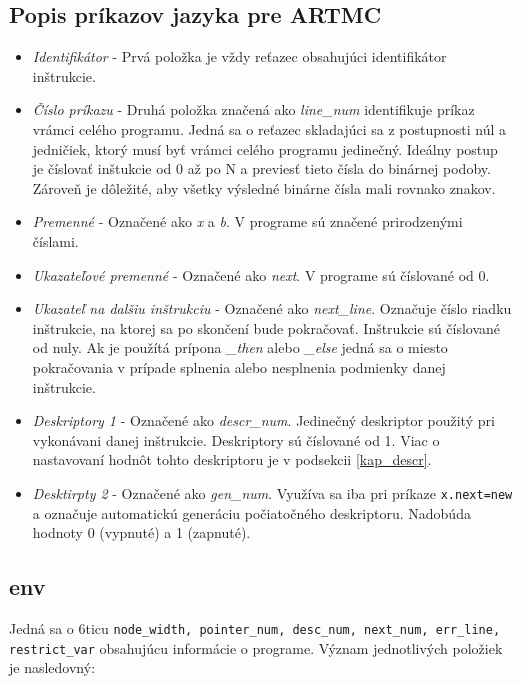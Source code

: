\subsection{Popis príkazov jazyka pre ARTMC}
\begin{itemize}
    \item \textit{Identifikátor} - Prvá položka je vždy reťazec obsahujúci identifikátor inštrukcie.
    \item \textit{Číslo príkazu} - Druhá položka značená ako \textit{line\_num} identifikuje príkaz
        vrámci celého programu. Jedná sa o reťazec skladajúci sa z postupnosti
        núl a jedničiek, ktorý musí byť vrámci celého  programu jedinečný.
        Ideálny postup je číslovať inštukcie od 0 až po N a previesť tieto
        čísla do binárnej podoby. Zároveň je dôležité, aby všetky výsledné binárne čísla mali rovnako znakov.
    \item \textit{Premenné} - Označené ako \textit{x} a \textit{b}. V programe sú značené prirodzenými číslami.
    \item \textit{Ukazateľové premenné} - Označené ako \textit{next}. V programe sú číslované od 0.
    \item \textit{Ukazateľ na dalšiu inštrukciu} - Označené ako \textit{next\_line}. Označuje
        číslo riadku inštrukcie, na ktorej sa po skončení bude pokračovať. Inštrukcie
        sú číslované od nuly. Ak je použítá prípona \textit{\_then} alebo \textit{\_else}
        jedná sa o miesto pokračovania v prípade splnenia alebo nesplnenia podmienky danej inštrukcie.
    \item \textit{Deskriptory 1} - Označené ako \textit{descr\_num}. Jedinečný deskriptor použitý pri vykonávani danej inštrukcie. Deskriptory sú číslované od 1. Viac o nastavovaní hodnôt tohto deskriptoru je v podsekcii \ref{kap_descr}.
    \item \textit{Desktirpty 2} - Označené ako \textit{gen\_num}. Využíva sa iba pri príkaze \texttt{x.next=new} a označuje automatickú generáciu počiatočného deskriptoru. Nadobúda hodnoty 0 (vypnuté) a 1 (zapnuté).
\end{itemize}

\subsection{env}
Jedná sa o 6ticu \texttt{node\_width, pointer\_num, desc\_num, next\_num, err\_line, restrict\_var} obsahujúcu informácie o programe.
Význam jednotlivých položiek je nasledovný:

